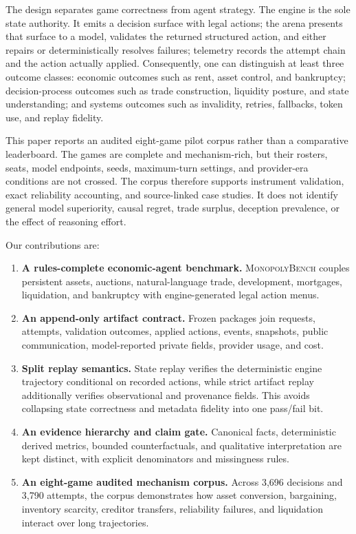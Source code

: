 \documentclass[conference]{IEEEtran}
\newcommand{\Bench}{\textsc{MonopolyBench}\xspace}
\begin{document}
The design separates game correctness from agent strategy. The engine is the sole state authority. It emits a decision surface with legal actions; the arena presents that surface to a model, validates the returned structured action, and either repairs or deterministically resolves failures; telemetry records the attempt chain and the action actually applied. Consequently, one can distinguish at least three outcome classes: economic outcomes such as rent, asset control, and bankruptcy; decision-process outcomes such as trade construction, liquidity posture, and state understanding; and systems outcomes such as invalidity, retries, fallbacks, token use, and replay fidelity.

This paper reports an audited eight-game pilot corpus rather than a comparative leaderboard. The games are complete and mechanism-rich, but their rosters, seats, model endpoints, seeds, maximum-turn settings, and provider-era conditions are not crossed. The corpus therefore supports instrument validation, exact reliability accounting, and source-linked case studies. It does not identify general model superiority, causal regret, trade surplus, deception prevalence, or the effect of reasoning effort.

Our contributions are:
\begin{enumerate}
    \item \textbf{A rules-complete economic-agent benchmark.} \Bench couples persistent assets, auctions, natural-language trade, development, mortgages, liquidation, and bankruptcy with engine-generated legal action menus.
    \item \textbf{An append-only artifact contract.} Frozen packages join requests, attempts, validation outcomes, applied actions, events, snapshots, public communication, model-reported private fields, provider usage, and cost.
    \item \textbf{Split replay semantics.} State replay verifies the deterministic engine trajectory conditional on recorded actions, while strict artifact replay additionally verifies observational and provenance fields. This avoids collapsing state correctness and metadata fidelity into one pass/fail bit.
    \item \textbf{An evidence hierarchy and claim gate.} Canonical facts, deterministic derived metrics, bounded counterfactuals, and qualitative interpretation are kept distinct, with explicit denominators and missingness rules.
    \item \textbf{An eight-game audited mechanism corpus.} Across 3,696 decisions and 3,790 attempts, the corpus demonstrates how asset conversion, bargaining, inventory scarcity, creditor transfers, reliability failures, and liquidation interact over long trajectories.
\end{enumerate}
\end{document}
